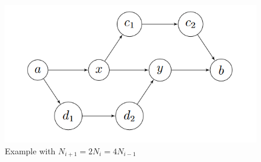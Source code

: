\documentclass{puthesis-UG}
\begin{document}
\begin{figure}[ht] 
	\begin{center}
		\includegraphics[scale = 0.8]{image6.png}
		\caption{Example with $N_{i+1} = 2N_i = 4 N_{i-1}$}
		\label{fig:example-of-a-is-two}
	\end{center}
\end{figure}
\end{document}
